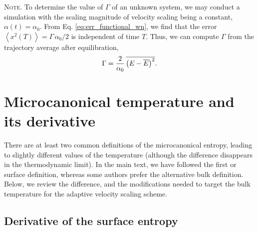 \documentclass[reprint]{revtex4-1}
\newcommand{\note}[1]{{\color{DarkGreen}\footnotesize \textsc{Note.} #1}}
\begin{document}
\note{
  To determine the value of $\Gamma$ of an unknown system,
  we may conduct a simulation
  with the scaling magnitude of velocity scaling
  being a constant, $\alpha(t) = \alpha_0$.
  From Eq. \eqref{eq:err_functional_wn}, we find that
  the error
  $\left\langle
    x^2(T)
  \right\rangle
  =
  \Gamma \, \alpha_0 / 2$
  is independent of time $T$.
  Thus, we can compute $\Gamma$ from the trajectory average
  after equilibration,
  \begin{equation}
  \Gamma
  =
  \frac{ 2 } { \alpha_0 } \,
  \overline{
    \bigl(
      E - \overline E
    \bigr)^2
  }
  .
  \notag
  \end{equation}
}



\section{\label{sec:microT}
Microcanonical temperature and its derivative}



There are at least two common definitions of
the microcanonical entropy,
leading to slightly different values of the temperature
(although the difference disappears in the thermodynamic limit).
%
In the main text, we have followed the first or surface
definition, whereas some authors prefer
the alternative bulk definition.
%
Below, we review the difference,
and the modifications needed to target the bulk temperature
for the adaptive velocity scaling scheme.



\subsection{Derivative of the surface entropy}
\end{document}
